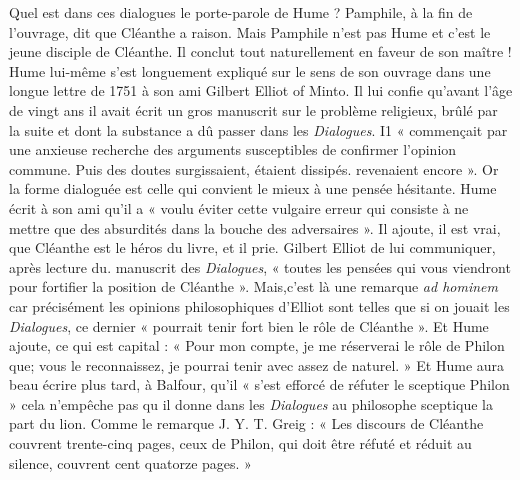 Quel est dans ces dialogues le porte-parole de Hume ?
Pamphile, à la fin de l’ouvrage, dit que Cléanthe a raison.
Mais Pamphile n’est pas Hume et c’est le jeune disciple
de Cléanthe. Il conclut tout naturellement en faveur de
son maître ! Hume lui-même s’est longuement expliqué
sur le sens de son ouvrage dans une longue lettre de 1751
à son ami Gilbert Elliot of Minto. Il lui confie qu'avant
l’âge de vingt ans il avait écrit un gros manuscrit sur le
problème religieux, brûlé par la suite et dont la substance
a dû passer dans les {\it Dialogues}. I1 « commençait par une
anxieuse recherche des arguments susceptibles de confirmer
l’opinion commune. Puis des doutes surgissaient,
étaient dissipés. revenaient encore ». Or la forme dialoguée
est celle qui convient le mieux à une pensée hésitante.
Hume écrit à son ami qu’il a « voulu éviter cette vulgaire
erreur qui consiste à ne mettre que des absurdités dans
la bouche des adversaires ». Il ajoute, il est vrai, que
Cléanthe est le héros du livre, et il prie. Gilbert Elliot de
lui communiquer, après lecture du. manuscrit des {\it Dialogues},
« toutes les pensées qui vous viendront pour fortifier la position
de Cléanthe ». Mais,c’est là une remarque
{\it ad hominem} car précisément les opinions philosophiques
d’Elliot sont telles que si on jouait les {\it Dialogues}, ce dernier
« pourrait tenir fort bien le rôle de Cléanthe ». Et Hume
ajoute, ce qui est capital : « Pour mon compte, je me
réserverai le rôle de Philon que; vous le reconnaissez,
je pourrai tenir avec assez de naturel. » Et Hume aura
beau écrire plus tard, à Balfour, qu’il « s’est efforcé de
réfuter le sceptique Philon » cela n’empêche pas qu il
donne dans les {\it Dialogues} au philosophe sceptique la
part du lion. Comme le remarque J. Y. T. Greig : « Les
discours de Cléanthe couvrent trente-cinq pages, ceux de
Philon, qui doit être réfuté et réduit au silence, couvrent
cent quatorze pages. »

